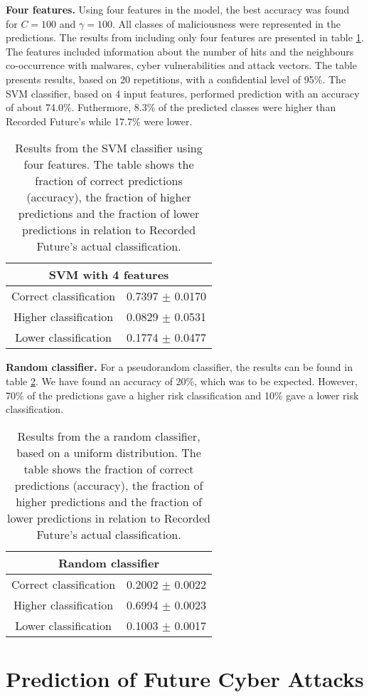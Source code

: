 \textbf{Four features.} Using four features in the model, the best accuracy was found for $C=100$ and $\gamma=100$. All classes of maliciousness were represented in the predictions. The results from including only four features are presented in table \ref{IpRes4Feat}. The features included information about the number of hits and the neighbours co-occurrence with malwares, cyber vulnerabilities and attack vectors. The table presents results, based on 20 repetitions, with a confidential level of 95\%. The SVM classifier, based on 4 input features, performed prediction with an accuracy of about 74.0\%. Futhermore, 8.3\% of the predicted classes were higher than Recorded Future's while 17.7\% were lower. 

\begin{table}[h!]
    \centering
    \caption{Results from the SVM classifier using four features. The table shows the fraction of correct predictions (accuracy), the fraction of higher predictions and the fraction of lower predictions in relation to Recorded Future's actual classification.}
    \begin{tabular}{|c|c|}
    \hline
        \multicolumn{2}{|c|}{SVM with 4 features}\\ \hline
        Correct classification  & 0.7397 $\pm$ 0.0170 \\
        Higher classification   & 0.0829 $\pm$ 0.0531 \\
        Lower classification    & 0.1774 $\pm$ 0.0477 \\ \hline
    \end{tabular}
    \label{IpRes4Feat}
\end{table}

\textbf{Random classifier.} For a pseudorandom classifier, the results can be found in table \ref{randClass}. We have found an accuracy of 20\%, which was to be expected. However, 70\% of the predictions gave a higher risk classification and 10\% gave a lower risk classification.

\begin{table}[h!]
    \centering
    \caption{Results from the a random classifier, based on a uniform distribution. The table shows the fraction of correct predictions (accuracy), the fraction of higher predictions and the fraction of lower predictions in relation to Recorded Future's actual classification.}
    \begin{tabular}{|c|c|}
    \hline
        \multicolumn{2}{|c|}{Random classifier}\\ \hline
        Correct classification & 0.2002 $\pm$ 0.0022 \\
        Higher classification  & 0.6994 $\pm$ 0.0023\\
        Lower classification   & 0.1003 $\pm$ 0.0017\\ \hline
    \end{tabular}
    \label{randClass}
\end{table}

\FloatBarrier
\section{Prediction of Future Cyber Attacks}

